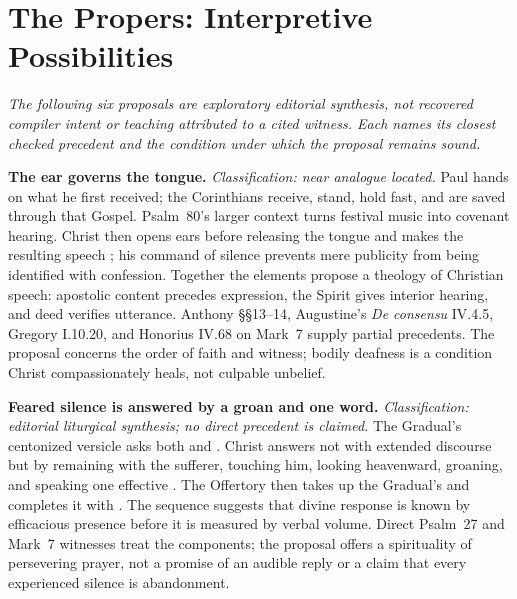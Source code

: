 \sectionguard
{}
\section*{The Propers: Interpretive Possibilities}

\noindent\emph{The following six proposals are exploratory editorial
synthesis, not recovered compiler intent or teaching attributed to a cited
witness. Each names its closest checked precedent and the condition under which
the proposal remains sound.}

\noindent\textbf{The ear governs the tongue.\enspace{}}
\emph{Classification: near analogue located.} Paul hands on what he first
received; the Corinthians receive, stand, hold fast, and are saved through that
Gospel. Psalm~80's larger context turns festival music into covenant hearing.
Christ then opens ears before releasing the tongue and makes the resulting
speech ; his command of silence prevents mere publicity from being
identified with confession. Together the elements propose a theology of
Christian speech: apostolic content precedes expression, the Spirit gives
interior hearing, and deed verifies utterance. Anthony §§13--14, Augustine's
\emph{De consensu} IV.4.5, Gregory I.10.20, and Honorius IV.68 on Mark~7
supply partial precedents. The proposal concerns the order of faith and witness; bodily
deafness is a condition Christ compassionately heals, not culpable unbelief.

\noindent\textbf{Feared silence is answered by a groan and one word.\enspace{}}
\emph{Classification: editorial liturgical synthesis; no direct precedent
is claimed.} The Gradual's
centonized versicle asks both  and .
Christ answers not with extended discourse but by remaining with the sufferer,
touching him, looking heavenward, groaning, and speaking one effective
. The Offertory then takes up the Gradual's
 and completes it with . The sequence suggests
that divine response is known by efficacious presence before it is measured by
verbal volume. Direct Psalm~27 and Mark~7 witnesses treat the components; the
proposal offers a spirituality of
persevering prayer, not a promise of an audible reply or a claim that every
experienced silence is abandonment.

